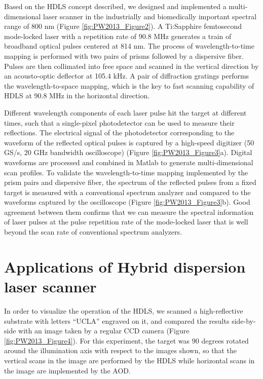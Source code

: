 Based on the HDLS concept described, we designed and implemented a multi-dimensional laser scanner in the industrially and biomedically important spectral range of 800 nm (Figure \ref{fig:PW2013_Figure2}). A Ti:Sapphire femtosecond mode-locked laser with a repetition rate of 90.8 MHz generates a train of broadband optical pulses centered at 814 nm. The process of wavelength-to-time mapping is performed with two pairs of prisms followed by a dispersive fiber. Pulses are then collimated into free space and scanned in the vertical direction by an acousto-optic deflector at 105.4 kHz. A pair of diffraction gratings performs the wavelength-to-space mapping, which is the key to fast scanning capability of HDLS at 90.8 MHz in the horizontal direction. 

Different wavelength components of each laser pulse hit the target at different times, such that a single-pixel photodetector can be used to measure their reflections. The electrical signal of the photodetector corresponding to the waveform of the reflected optical pulses is captured by a high-speed digitizer (50 GS/s, 20 GHz bandwidth oscilloscope) (Figure \ref{fig:PW2013_Figure3}a). Digital waveforms are processed and combined in Matlab to generate multi-dimensional scan profiles. To validate the wavelength-to-time mapping implemented by the prism pairs and dispersive fiber, the spectrum of the reflected pulses from a fixed target is measured with a conventional spectrum analyzer and compared to the waveforms captured by the oscilloscope (Figure \ref{fig:PW2013_Figure3}b). Good agreement between them confirms that we can measure the spectral information of laser pulses at the pulse repetition rate of the mode-locked laser that is well beyond the scan rate of conventional spectrum analyzers.

\section{Applications of Hybrid dispersion laser scanner}

In order to visualize the operation of the HDLS, we scanned a high-reflective substrate with letters “UCLA” engraved on it, and compared the results side-by-side with an image taken by a regular CCD camera (Figure \ref{fig:PW2013_Figure4}). For this experiment, the target was 90 degrees rotated around the illumination axis with respect to the images shown, so that the vertical scans in the image are performed by the HDLS while horizontal scans in the image are implemented by the AOD.

